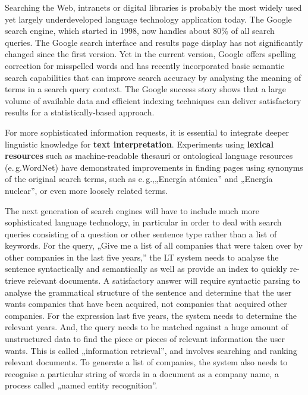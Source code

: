\begin{multicols}{2}
Searching the Web, intranets or digital libraries is probably the most widely used yet largely underdeveloped language technology application today. The Google search engine, which started in 1998, now handles about 80\% of all search queries. The Google search interface and results page display has not significantly changed since the first version. Yet in the current version, Google offers spelling correction for misspelled words and has recently incorporated basic semantic search capabilities that can improve search accuracy by analysing the meaning of terms in a search query context.  The Google success story shows that a large volume of available data and efficient indexing techniques can deliver satisfactory results for a statistically-based approach.

For more sophisticated information requests, it is essential to integrate deeper linguistic knowledge for \textbf{text interpretation}. Experiments using \textbf{lexical resources} such as machine-readable thesauri or ontological language resources (e.\,g.WordNet) have demonstrated improvements in finding pages using synonyms of the original search terms, such as e.\,g.,„Energía atómica” and „Energía nuclear”, or even more loosely related terms. 


The next generation of search engines will have to include much more sophisticated language technology, in particular in order to deal with search queries consisting of a question or other sentence type rather than a list of keywords. For the query, „Give me a list of all companies that were taken over by other companies in the last five years,” the LT system needs to analyse the sentence syntactically and semantically as well as provide an index to quickly re-trieve relevant documents. A satisfactory answer will require syntactic parsing to analyse the grammatical structure of the sentence and determine that the user wants companies that have been acquired, not companies that acquired other companies. For the expression last five years, the system needs to determine the relevant years. And, the query needs to be matched against a huge amount of unstructured data to find the piece or pieces of relevant information the user wants. This is called „information retrieval”, and involves searching and ranking relevant documents. To generate a list of companies, the system also needs to recognise a particular string of words in a document as a company name, a process called „named entity recognition”.


\end{multicols}
